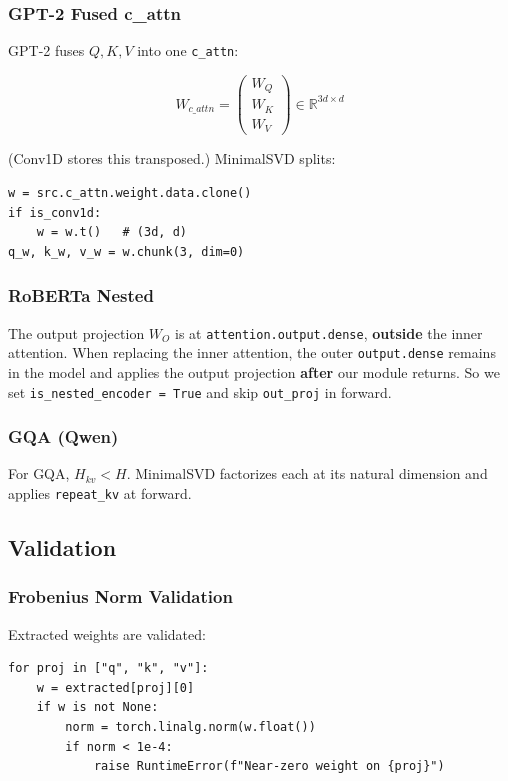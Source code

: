\subsubsection{GPT-2 Fused c\_attn}

GPT-2 fuses $Q, K, V$ into one \texttt{c\_attn}:

\[
W_{c\_attn} = \begin{pmatrix} W_Q \\ W_K \\ W_V \end{pmatrix} \in \mathbb{R}^{3d \times d}
\tag{4.7}
\]

(Conv1D stores this transposed.) MinimalSVD splits:

\begin{lstlisting}
w = src.c_attn.weight.data.clone()
if is_conv1d:
    w = w.t()   # (3d, d)
q_w, k_w, v_w = w.chunk(3, dim=0)
\end{lstlisting}

\subsubsection{RoBERTa Nested}

The output projection $W_O$ is at \texttt{attention.output.dense}, \textbf{outside} the 
inner attention. When replacing the inner attention, the outer \texttt{output.dense} 
remains in the model and applies the output projection \textbf{after} our module 
returns. So we set \texttt{is\_nested\_encoder = True} and skip \texttt{out\_proj} in forward.

\subsubsection{GQA (Qwen)}

For GQA, $H_{kv} < H$. MinimalSVD factorizes each at its natural dimension 
and applies \texttt{repeat\_kv} at forward.

\subsection{Validation}

\subsubsection{Frobenius Norm Validation}

Extracted weights are validated:

\begin{lstlisting}
for proj in ["q", "k", "v"]:
    w = extracted[proj][0]
    if w is not None:
        norm = torch.linalg.norm(w.float())
        if norm < 1e-4:
            raise RuntimeError(f"Near-zero weight on {proj}")
\end{lstlisting}

